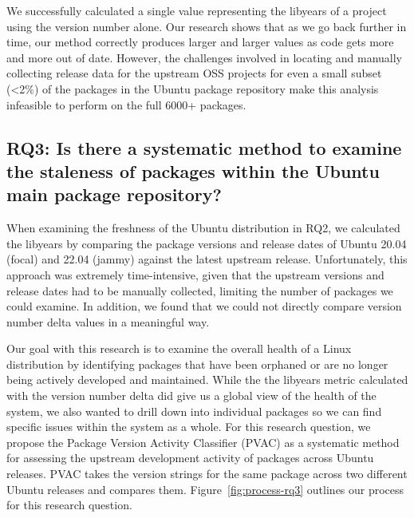 \documentclass[sn-mathphys-num]{sn-jnl}%
\theoremstyle{thmstyleone}%
\theoremstyle{thmstyletwo}%
\theoremstyle{thmstylethree}%
\begin{document}
\begin{tcolorbox}[enhanced,attach boxed title to top center={yshift=-3mm,yshifttext=-1mm}, colback=blue!5!white,colframe=blue!75!black,colbacktitle=red!80!black, title=Answer to RQ2,fonttitle=\bfseries, boxed title style={size=small,colframe=red!50!black} ]

   We successfully calculated a single value representing the libyears of a project using the version number alone. Our research shows that as we go back further in time, our method correctly produces larger and larger values as code gets more and more out of date. However, the challenges involved in locating and manually collecting release data for the upstream OSS projects for even a small subset (\textless2\%) of the packages in the Ubuntu package repository make this analysis infeasible to perform on the full 6000+ packages.

\end{tcolorbox}

\subsection{\textbf{RQ3: Is there a systematic method to examine the staleness of packages within the Ubuntu main package repository?}}

When examining the freshness of the Ubuntu distribution in RQ2, we calculated the libyears by comparing the package versions and release dates of Ubuntu 20.04 (focal) and 22.04 (jammy) against the latest upstream release. Unfortunately, this approach was extremely time-intensive, given that the upstream versions and release dates had to be manually collected, limiting the number of packages we could examine. In addition, we found that we could not directly compare version number delta values in a meaningful way. 

Our goal with this research is to examine the overall health of a Linux distribution by identifying packages that have been orphaned or are no longer being actively developed and maintained. While the the libyears metric calculated with the version number delta did give us a global view of the health of the system, we also wanted to drill down into individual packages so we can find specific issues within the system as a whole. For this research question, we propose the Package Version Activity Classifier (PVAC) as a systematic method for assessing the upstream development activity of packages across Ubuntu releases. PVAC takes the version strings for the same package across two different Ubuntu releases and compares them. Figure~\ref{fig:process-rq3} outlines our process for this research question.
\end{document}
